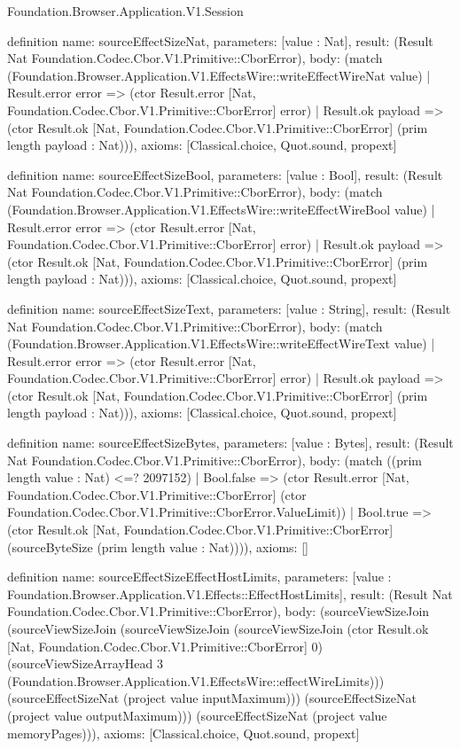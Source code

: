 \begin{lexlean}{Foundation.Browser.Application.V1.Session}
\begin{semanticmodule}
definition{
  name: sourceEffectSizeNat,
  parameters: [value : Nat],
  result: (Result Nat Foundation.Codec.Cbor.V1.Primitive::CborError),
  body: (match (Foundation.Browser.Application.V1.EffectsWire::writeEffectWireNat value)
    | Result.error error => (ctor Result.error [Nat, Foundation.Codec.Cbor.V1.Primitive::CborError] error)
    | Result.ok payload => (ctor Result.ok [Nat, Foundation.Codec.Cbor.V1.Primitive::CborError] (prim length payload : Nat))),
  axioms: [Classical.choice, Quot.sound, propext]
}

definition{
  name: sourceEffectSizeBool,
  parameters: [value : Bool],
  result: (Result Nat Foundation.Codec.Cbor.V1.Primitive::CborError),
  body: (match (Foundation.Browser.Application.V1.EffectsWire::writeEffectWireBool value)
    | Result.error error => (ctor Result.error [Nat, Foundation.Codec.Cbor.V1.Primitive::CborError] error)
    | Result.ok payload => (ctor Result.ok [Nat, Foundation.Codec.Cbor.V1.Primitive::CborError] (prim length payload : Nat))),
  axioms: [Classical.choice, Quot.sound, propext]
}

definition{
  name: sourceEffectSizeText,
  parameters: [value : String],
  result: (Result Nat Foundation.Codec.Cbor.V1.Primitive::CborError),
  body: (match (Foundation.Browser.Application.V1.EffectsWire::writeEffectWireText value)
    | Result.error error => (ctor Result.error [Nat, Foundation.Codec.Cbor.V1.Primitive::CborError] error)
    | Result.ok payload => (ctor Result.ok [Nat, Foundation.Codec.Cbor.V1.Primitive::CborError] (prim length payload : Nat))),
  axioms: [Classical.choice, Quot.sound, propext]
}

definition{
  name: sourceEffectSizeBytes,
  parameters: [value : Bytes],
  result: (Result Nat Foundation.Codec.Cbor.V1.Primitive::CborError),
  body: (match ((prim length value : Nat) <=? 2097152)
    | Bool.false => (ctor Result.error [Nat, Foundation.Codec.Cbor.V1.Primitive::CborError] (ctor Foundation.Codec.Cbor.V1.Primitive::CborError.ValueLimit))
    | Bool.true => (ctor Result.ok [Nat, Foundation.Codec.Cbor.V1.Primitive::CborError] (sourceByteSize (prim length value : Nat)))),
  axioms: []
}

definition{
  name: sourceEffectSizeEffectHostLimits,
  parameters: [value : Foundation.Browser.Application.V1.Effects::EffectHostLimits],
  result: (Result Nat Foundation.Codec.Cbor.V1.Primitive::CborError),
  body: (sourceViewSizeJoin (sourceViewSizeJoin (sourceViewSizeJoin (sourceViewSizeJoin (ctor Result.ok [Nat, Foundation.Codec.Cbor.V1.Primitive::CborError] 0) (sourceViewSizeArrayHead 3 (Foundation.Browser.Application.V1.EffectsWire::effectWireLimits))) (sourceEffectSizeNat (project value inputMaximum))) (sourceEffectSizeNat (project value outputMaximum))) (sourceEffectSizeNat (project value memoryPages))),
  axioms: [Classical.choice, Quot.sound, propext]
}


\end{semanticmodule}
\end{lexlean}
